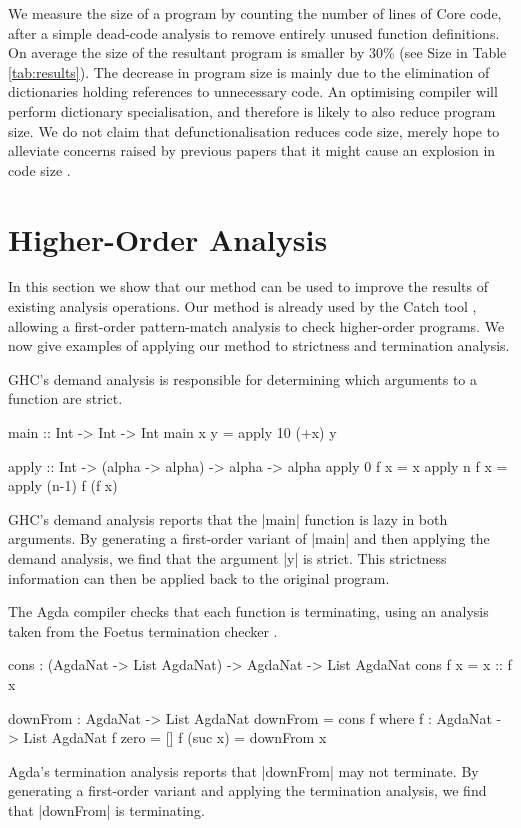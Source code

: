 \documentclass{sigplanconf}
\begin{document}
We measure the size of a program by counting the number of lines of Core code, after a simple dead-code analysis to remove entirely unused function definitions. On average the size of the resultant program is smaller by 30\% (see Size in Table \ref{tab:results}). The decrease in program size is mainly due to the elimination of dictionaries holding references to unnecessary code. An optimising compiler will perform dictionary specialisation, and therefore is likely to also reduce program size. We do not claim that defunctionalisation reduces code size, merely hope to alleviate concerns raised by previous papers that it might cause an explosion in code size \cite{chin:higher_order_removal}.

\section{Higher-Order Analysis}
\label{sec:strictness}

In this section we show that our method can be used to improve the results of existing analysis operations. Our method is already used by the Catch tool \cite{me:catch}, allowing a first-order pattern-match analysis to check higher-order programs. We now give examples of applying our method to strictness and termination analysis.

\begin{example}
GHC's demand analysis \cite{ghc} is responsible for determining which arguments to a function are strict.

\begin{code}
main :: Int -> Int -> Int
main x y = apply 10 (+x) y

apply :: Int -> (alpha -> alpha) -> alpha -> alpha
apply 0 f x = x
apply n f x = apply (n-1) f (f x)
\end{code}

GHC's demand analysis reports that the |main| function is lazy in both arguments. By generating a first-order variant of |main| and then applying the demand analysis, we find that the argument |y| is strict. This strictness information can then be applied back to the original program.
\end{example}

\begin{example}
The Agda compiler \cite{agda} checks that each function is terminating, using an analysis taken from the Foetus termination checker \cite{abel:foetus}.

\ignore\begin{code}
cons : (AgdaNat -> List AgdaNat) -> AgdaNat -> List AgdaNat
cons f x = x :: f x

downFrom : AgdaNat -> List AgdaNat
downFrom = cons f
    where  f : AgdaNat -> List AgdaNat
           f zero     = []
           f (suc x)  = downFrom x
\end{code}

Agda's termination analysis reports that |downFrom| may not terminate. By generating a first-order variant and applying the termination analysis, we find that |downFrom| is terminating.
\end{example}
\smallskip
\end{document}

